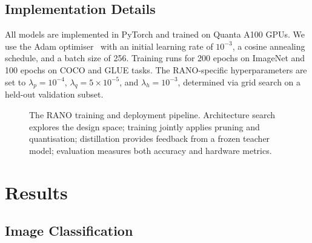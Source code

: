\documentclass[12pt,a4paper,oneside]{book}
\begin{document}
\subsection{Implementation Details}

All models are implemented in PyTorch and trained on Quanta A100 GPUs.
We use the Adam optimiser~\cite{kingma2014adam} with an initial learning
rate of $10^{-3}$, a cosine annealing schedule, and a batch size of 256.
Training runs for 200 epochs on ImageNet and 100 epochs on COCO and
GLUE tasks. The RANO-specific hyperparameters are set to
$\lambda_p = 10^{-4}$, $\lambda_q = 5 \times 10^{-5}$, and
$\lambda_h = 10^{-3}$, determined via grid search on a held-out
validation subset.

\begin{figure}[htbp]
\centering
{}
\caption{The RANO training and deployment pipeline. Architecture search
explores the design space; training jointly applies pruning and
quantisation; distillation provides feedback from a frozen teacher
model; evaluation measures both accuracy and hardware metrics.}
\label{fig:pipeline}
\end{figure}

\section{Results}

\subsection{Image Classification}
\end{document}

